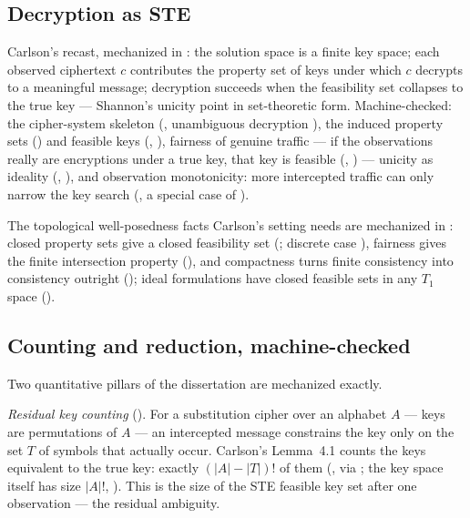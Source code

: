 \documentclass[11pt]{article}
\begin{document}
\subsection{Decryption as STE}

Carlson's recast, mechanized in : the
solution space is a finite key space; each observed ciphertext $c$
contributes the property set of keys under which $c$ decrypts to a
meaningful message; decryption succeeds when the feasibility set
collapses to the true key --- Shannon's unicity point
\citep{shannon1949} in set-theoretic form.  Machine-checked: the
cipher-system skeleton (, unambiguous decryption
), the induced property sets
() and feasible keys (,
), fairness of genuine traffic --- if the
observations really are encryptions under a true key, that key is
feasible (,
) --- unicity as ideality
(, ), and observation
monotonicity: more intercepted traffic can only narrow the key search
(, a special case of
).

The topological well-posedness facts Carlson's setting needs are
mechanized in : closed property sets give a closed
feasibility set (; discrete case
), fairness gives the
finite intersection property (), and
compactness turns finite consistency into consistency outright
(); ideal formulations have
closed feasible sets in any $T_1$ space
().

\subsection{Counting and reduction, machine-checked}

Two quantitative pillars of the dissertation are mechanized exactly.

\emph{Residual key counting} ().  For a
substitution cipher over an alphabet $A$ --- keys are permutations of
$A$ --- an intercepted message constrains the key only on the set $T$
of symbols that actually occur.  Carlson's Lemma~4.1 counts the keys
equivalent to the true key: exactly $(|A| - |T|)!$ of them
(, via ; the key
space itself has size $|A|!$, ).  This is
the size of the STE feasible key set after one observation --- the
residual ambiguity.
\end{document}
